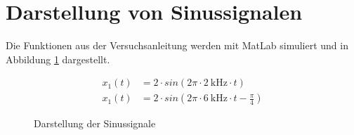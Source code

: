 \documentclass[
    paper=a4,
    fontsize=10pt,
    DIV=calc,
    twocolumn,
    oneside,
]{scrartcl}
\date{\today}
\begin{document}
\maketitle




\section{Darstellung von Sinussignalen}
    Die Funktionen aus der Versuchsanleitung \cite{versuch1} werden mit MatLab simuliert und in Abbildung \ref{fig:a1} dargestellt.

    \begin{align}
        x_1(t) &= 2 \cdot sin(2\pi \cdot \SI{2}{\kilo\hertz} \cdot t)\\
        x_1(t) &= 2 \cdot sin(2\pi \cdot \SI{6}{\kilo\hertz} \cdot t - \frac{\pi}{4})
    \end{align}

    \begin{figure}[hbt]
        \centering
        
        \caption{Darstellung der Sinussignale}
        \label{fig:a1}
    \end{figure}




\printbibliography[heading=bibnumbered]
\end{document}
